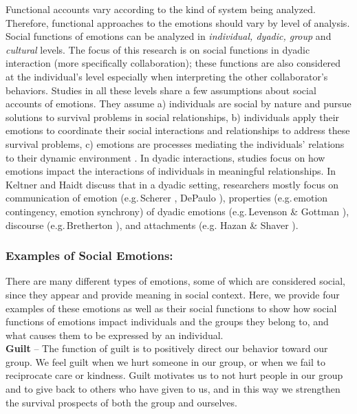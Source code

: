 \documentclass[12pt]{report}
\begin{document}
Functional accounts vary according to the kind of system being analyzed.
Therefore, functional approaches to the emotions should vary by level of
analysis. Social functions of emotions can be analyzed in \textit{individual,
dyadic, group} and \textit{cultural} levels. The focus of this research is
on social functions in dyadic interaction (more specifically collaboration);
these functions are also considered at the individual's level especially when
interpreting the other collaborator's behaviors. Studies in all these levels
share a few assumptions about social accounts of emotions. They assume a)
individuals are social by nature and pursue solutions to survival problems in
social relationships, b) individuals apply their emotions to coordinate their
social interactions and relationships to address these survival problems, c)
emotions are processes mediating the individuals' relations to their dynamic
environment \cite{keltner:emotion-functions}. In dyadic interactions, studies
focus on how emotions impact the interactions of individuals in meaningful
relationships. In \cite{keltner:emotion-functions} Keltner and Haidt discuss
that in a dyadic setting, researchers mostly focus on communication of emotion
(e.g.\,Scherer \cite{scherer:vocal-expression}, DePaulo
\cite{depaulo:nonverbal-behavior}), properties (e.g.\,emotion contingency,
emotion synchrony) of dyadic emotions (e.g.\,Levenson \& Gottman
\cite{levenson:affective-exchange}), discourse (e.g.\,Bretherton
\cite{bretherton:emotions-functionalist}), and attachments (e.g. Hazan \& Shaver
\cite{hazan:emotion-attachment}).

\subsubsection{Examples of Social Emotions:}

There are many different types of emotions, some of which are considered social,
since they appear and provide meaning in social context. Here, we provide four
examples of these emotions as well as their social functions to show how social
functions of emotions impact individuals and the groups they belong to, and what
causes them to be expressed by an individual.\\

\noindent \textbf{Guilt} -- The function of guilt is to positively direct our
behavior toward our group. We feel guilt when we hurt someone in our group, or
when we fail to reciprocate care or kindness. Guilt motivates us to not hurt
people in our group and to give back to others who have given to us, and in this
way we strengthen the survival prospects of both the group and ourselves.
\end{document}
